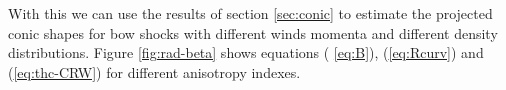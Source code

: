 
With this we can use the results of section \ref{sec:conic} to estimate the projected conic shapes for bow shocks with different winds 
momenta and different density distributions. Figure \ref{fig:rad-beta} shows equations ( \ref{eq:B}), (\ref{eq:Rcurv}) and (\ref{eq:thc-CRW}) for different anisotropy indexes. 





